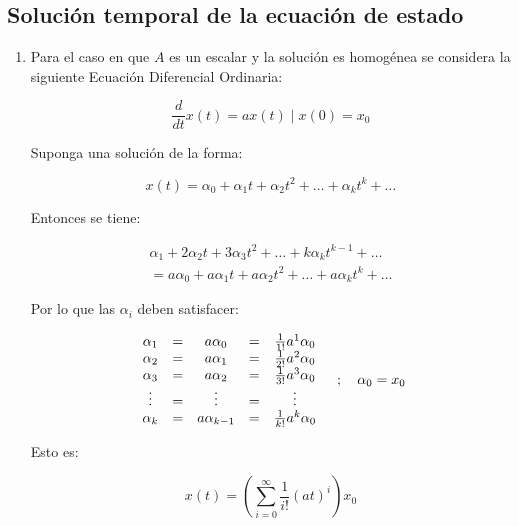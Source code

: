 \subsection{Solución temporal de la ecuación de estado}

\begin{enumerate}

\item
Para el caso en que $A$ es un escalar y la solución es homogénea se considera la siguiente Ecuación Diferencial Ordinaria:

\begin{equation}
\frac{d}{dt} x(t) = a x(t) \mid x(0) = x_0
\end{equation}

Suponga una solución de la forma:

\begin{equation}
x(t) = \alpha_0 + \alpha_1 t + \alpha_2 t^2 + \dots + \alpha_k t^k + \dots
\end{equation}

Entonces se tiene:

\begin{multline}
\alpha_1 + 2 \alpha_2 t + 3 \alpha_3 t^2 + \dots + k \alpha_k t^{k-1} + \dots \\ = a \alpha_0 + a \alpha_1 t + a \alpha_2 t^2 + \dots + a \alpha_k t^k + \dots \nonumber
\end{multline}

Por lo que las $\alpha_i$ deben satisfacer:

\begin{equation}
\begin{array}{c c c c c}
\alpha_1 & = & a \alpha_0     & = & \frac{1}{1!} a^1 \alpha_0 \\
\alpha_2 & = & a \alpha_1     & = & \frac{1}{2!} a^2 \alpha_0 \\
\alpha_3 & = & a \alpha_2     & = & \frac{1}{3!} a^3 \alpha_0 \\
\vdots   & = & \vdots         & = & \vdots                    \\
\alpha_k & = & a \alpha_{k-1} & = & \frac{1}{k!} a^k \alpha_0 \\
\end{array} \quad ; \quad \alpha_0 = x_0
\end{equation}

Esto es:

\begin{equation}
x(t) = \left( \sum\limits_{i = 0}^{\infty} \frac{1}{i!} (a t)^i \right) x_0 \nonumber
\end{equation}


\end{enumerate}
